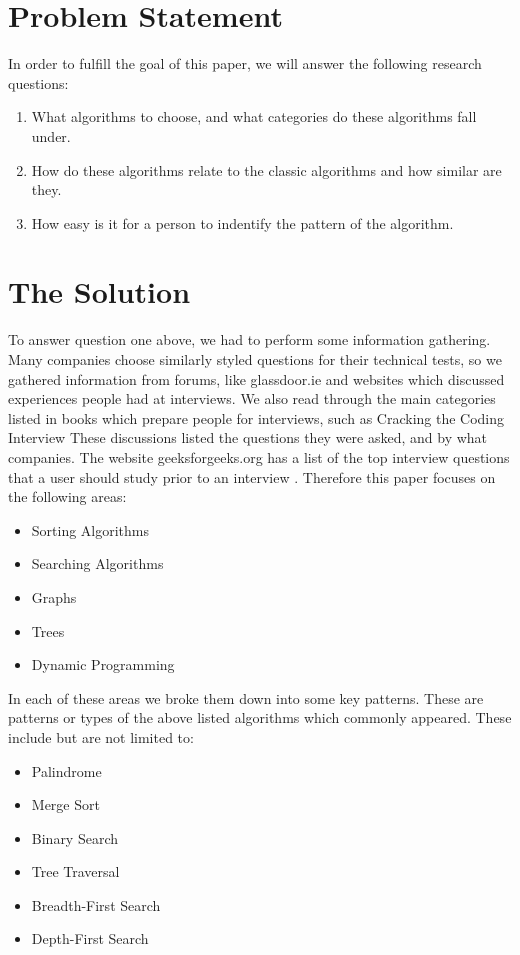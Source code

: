 \documentclass[10pt,twocolumn]{IEEEtran}
\begin{document}
\section{Problem Statement}
In order to fulfill the goal of this paper, we will answer the following research questions:
\begin{enumerate}
\item What algorithms to choose, and what categories do these algorithms fall under. 
\item How do these algorithms relate to the classic algorithms and how similar are they.
\item How easy is it for a person to indentify the pattern of the algorithm.
\end{enumerate}
\section{The Solution}
To answer question one above, we had to perform some information gathering. Many companies choose similarly styled questions for their technical tests, so we gathered information from forums, like glassdoor.ie \cite{glassdoor} and websites which discussed experiences people had at interviews. We also read through the main categories listed in books which prepare people for interviews, such as Cracking the Coding Interview \cite{mcdowell2015cracking} These discussions listed the questions they were asked, and by what companies. The website geeksforgeeks.org has a list of the top interview questions that a user should study prior to an interview \cite{geeksalgos}. Therefore this paper focuses on the following areas:
\begin{itemize}
\item Sorting Algorithms
\item Searching Algorithms
\item Graphs
\item Trees
\item Dynamic Programming
\end{itemize}
In each of these areas we broke them down into some key patterns. These are patterns or types of the above listed algorithms which commonly appeared. These include but are not limited to:
\begin{itemize}
\item Palindrome
\item Merge Sort
\item Binary Search
\item Tree Traversal
\item Breadth-First Search
\item Depth-First Search
\label{itm:patterns}
\end{itemize} 
\end{document}
